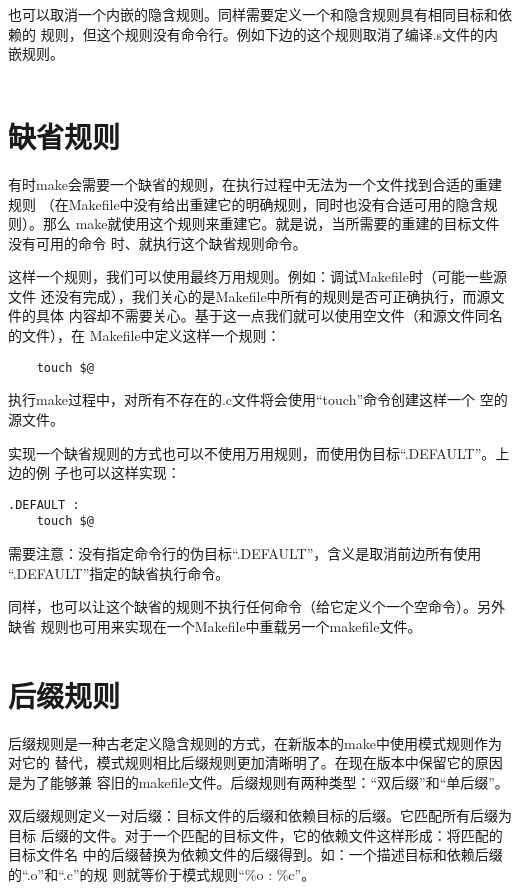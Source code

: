 也可以取消一个内嵌的隐含规则。同样需要定义一个和隐含规则具有相同目标和依赖的
规则，但这个规则没有命令行。例如下边的这个规则取消了编译.s文件的内嵌规则。
\begin{Verbatim}[]
%.o : %.s
\end{Verbatim}

\section{缺省规则}
有时make会需要一个缺省的规则，在执行过程中无法为一个文件找到合适的重建规则
（在Makefile中没有给出重建它的明确规则，同时也没有合适可用的隐含规则）。那么
make就使用这个规则来重建它。就是说，当所需要的重建的目标文件没有可用的命令
时、就执行这个缺省规则命令。

这样一个规则，我们可以使用最终万用规则。例如：调试Makefile时（可能一些源文件
还没有完成），我们关心的是Makefile中所有的规则是否可正确执行，而源文件的具体
内容却不需要关心。基于这一点我们就可以使用空文件（和源文件同名的文件），在
Makefile中定义这样一个规则：

\begin{Verbatim}[]
%::
    touch $@
\end{Verbatim}
\noindent 执行make过程中，对所有不存在的.c文件将会使用“touch”命令创建这样一个
空的源文件。

实现一个缺省规则的方式也可以不使用万用规则，而使用伪目标“.DEFAULT”。上边的例
子也可以这样实现：
\begin{Verbatim}[]
.DEFAULT :
    touch $@
\end{Verbatim}
\noindent 需要注意：没有指定命令行的伪目标“.DEFAULT”，含义是取消前边所有使用
“.DEFAULT”指定的缺省执行命令。

同样，也可以让这个缺省的规则不执行任何命令（给它定义个一个空命令）。另外缺省
规则也可用来实现在一个Makefile中重载另一个makefile文件。

\section{后缀规则}
后缀规则是一种古老定义隐含规则的方式，在新版本的make中使用模式规则作为对它的
替代，模式规则相比后缀规则更加清晰明了。在现在版本中保留它的原因是为了能够兼
容旧的makefile文件。后缀规则有两种类型：“双后缀”和“单后缀”。

双后缀规则定义一对后缀：目标文件的后缀和依赖目标的后缀。它匹配所有后缀为目标
后缀的文件。对于一个匹配的目标文件，它的依赖文件这样形成：将匹配的目标文件名
中的后缀替换为依赖文件的后缀得到。如：一个描述目标和依赖后缀的“.o”和“.c”的规
则就等价于模式规则“\%o : \%c”。

